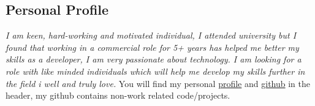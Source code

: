 \subsection{{Personal Profile}}
\textit{I am keen, hard-working and motivated individual, I attended university but I found that working in a commercial role for 5+ years has helped me better my skills as a developer, I am very passionate about technology. I am looking for a role with like minded individuals which will help me develop my skills further in the field i well and truly love.}
\newline
\newline
You will find my personal \href{https://turner485.github.io/personal-portfolio/}{profile} and \href{https://github.com/\github}{github} in the header,  my github contains non-work related code/projects. 
